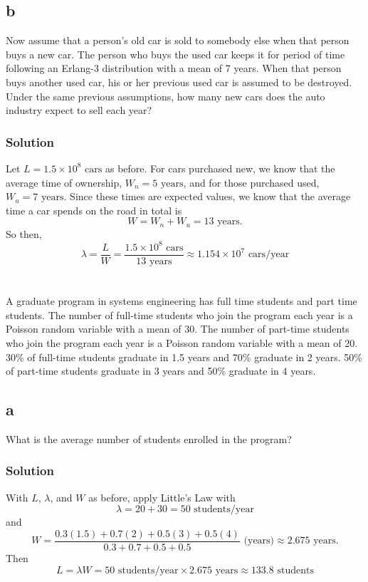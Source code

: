 \documentclass[letterpaper]{amsart}
\begin{document}
\subsection*{b}
Now assume that a person's old car is sold to somebody else when that person
buys a new car. The person who buys the used car keeps it for period of time
following an Erlang-3 distribution with a mean of 7 years. When that person buys
another used car, his or her previous used car is assumed to be destroyed. Under
the same previous assumptions, how many new cars does the auto industry
expect to sell each year?
\subsubsection*{Solution}
Let $L=1.5\times10^8\text{ cars}$ as before. For cars purchased new, we know
that the average time of ownership, $W_n = 5 \text{ years}$, and for those purchased
used, $W_u = 7 \text{ years}$. Since these times are expected values, we know
that the average time a car spends on the road in total is
\begin{equation}
  W = W_n+W_u=13\text{ years}.
\end{equation}
So then,
\begin{equation}
  \lambda = \frac{L}{W} = \frac{1.5\times10^8\text{ cars}}{13 \text{ years}}
  \approx 1.154\times10^7\text{ cars/year}
\end{equation}

\section{} %
A graduate program in systems engineering has full time students and part time students.
The number of full-time students who join the program each year is a Poisson random
variable with a mean of 30. The number of part-time students who join the program each
year is a Poisson random variable with a mean of 20. 30\% of full-time students graduate
in 1.5 years and 70\% graduate in 2 years. 50\% of part-time students graduate in 3 years
and 50\% graduate in 4 years.

\subsection*{a}
What is the average number of students enrolled in the program?
\subsubsection*{Solution}
With $L$, $\lambda$, and $W$ as before, apply Little's Law with
\begin{equation}
  \lambda = 20 + 30 = 50\text{ students/year}
\end{equation}
and
\begin{equation}
  W =\frac{0.3(1.5) + 0.7(2) + 0.5(3) + 0.5(4)}{0.3 + 0.7 + 0.5 + 0.5} \text{ (years)}
     \approx 2.675 \text{ years}.
\end{equation}
Then
\begin{equation}
  L = \lambda W = 50\text{ students/year} \times 2.675 \text{ years} \approx 133.8\text{ students}
\end{equation}
\end{document}
